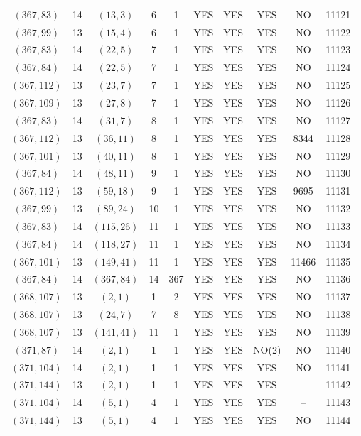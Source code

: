 \begin{longtable}{|c|c|c|c|c|c|c|c|c|c|}
$(367, 83)$ & 14 & $(13, 3)$ & 6 & 1 & YES & YES & YES & NO & 11121\\
$(367, 99)$ & 13 & $(15, 4)$ & 6 & 1 & YES & YES & YES & NO & 11122\\
$(367, 83)$ & 14 & $(22, 5)$ & 7 & 1 & YES & YES & YES & NO & 11123\\
$(367, 84)$ & 14 & $(22, 5)$ & 7 & 1 & YES & YES & YES & NO & 11124\\
$(367, 112)$ & 13 & $(23, 7)$ & 7 & 1 & YES & YES & YES & NO & 11125\\
$(367, 109)$ & 13 & $(27, 8)$ & 7 & 1 & YES & YES & YES & NO & 11126\\
$(367, 83)$ & 14 & $(31, 7)$ & 8 & 1 & YES & YES & YES & NO & 11127\\
$(367, 112)$ & 13 & $(36, 11)$ & 8 & 1 & YES & YES & YES & 8344 & 11128\\
$(367, 101)$ & 13 & $(40, 11)$ & 8 & 1 & YES & YES & YES & NO & 11129\\
$(367, 84)$ & 14 & $(48, 11)$ & 9 & 1 & YES & YES & YES & NO & 11130\\
$(367, 112)$ & 13 & $(59, 18)$ & 9 & 1 & YES & YES & YES & 9695 & 11131\\
$(367, 99)$ & 13 & $(89, 24)$ & 10 & 1 & YES & YES & YES & NO & 11132\\
$(367, 83)$ & 14 & $(115, 26)$ & 11 & 1 & YES & YES & YES & NO & 11133\\
$(367, 84)$ & 14 & $(118, 27)$ & 11 & 1 & YES & YES & YES & NO & 11134\\
$(367, 101)$ & 13 & $(149, 41)$ & 11 & 1 & YES & YES & YES & 11466 & 11135\\
$(367, 84)$ & 14 & $(367, 84)$ & 14 & 367 & YES & YES & YES & NO & 11136\\
$(368, 107)$ & 13 & $(2, 1)$ & 1 & 2 & YES & YES & YES & NO & 11137\\
$(368, 107)$ & 13 & $(24, 7)$ & 7 & 8 & YES & YES & YES & NO & 11138\\
$(368, 107)$ & 13 & $(141, 41)$ & 11 & 1 & YES & YES & YES & NO & 11139\\
$(371, 87)$ & 14 & $(2, 1)$ & 1 & 1 & YES & YES & NO(2) & NO & 11140\\
$(371, 104)$ & 14 & $(2, 1)$ & 1 & 1 & YES & YES & YES & NO & 11141\\
$(371, 144)$ & 13 & $(2, 1)$ & 1 & 1 & YES & YES & YES & -- & 11142\\
$(371, 104)$ & 14 & $(5, 1)$ & 4 & 1 & YES & YES & YES & -- & 11143\\
$(371, 144)$ & 13 & $(5, 1)$ & 4 & 1 & YES & YES & YES & NO & 11144\\

\end{longtable}
